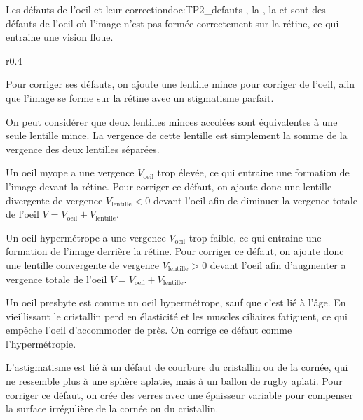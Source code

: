\begin{doc}{Les défauts de l'oeil et leur correction}{doc:TP2_defauts}
  , la , la  et  sont des défauts de l'oeil où l'image n'est pas formée correctement sur la rétine, ce qui entraine une vision floue.

  \begin{wrapfigure}[10]{r}{0.4\linewidth}
    \centering
    \vspace*{-2pt}
    
  \end{wrapfigure}
  
  Pour corriger ses défauts, on ajoute une lentille mince pour corriger  de l'oeil, afin que l'image se forme sur la rétine avec un stigmatisme parfait.

  \begin{importants}
    On peut considérer que deux lentilles minces accolées sont équivalentes à une seule lentille mince.
    La vergence de cette lentille est simplement la somme de la vergence des deux lentilles séparées.
  \end{importants}

  \pointCyan {}

  Un oeil myope a une vergence $V_\text{oeil}$ trop élevée, ce qui entraine une formation de l'image devant la rétine.
  Pour corriger ce défaut, on ajoute donc une lentille divergente de vergence $V_\text{lentille} < 0$ devant l'oeil afin de diminuer la vergence totale de l'oeil $V = V_\text{oeil} + V_\text{lentille}$.

  \pointCyan {}

  Un oeil hypermétrope a une vergence $V_\text{oeil}$ trop faible, ce qui entraine une formation de l'image derrière la rétine.
  Pour corriger ce défaut, on ajoute donc une lentille convergente de vergence $V_\text{lentille} > 0$ devant l'oeil afin d'augmenter a vergence totale de l'oeil $V = V_\text{oeil} + V_\text{lentille}$.

  \pointCyan {}

  Un oeil presbyte est comme un oeil hypermétrope, sauf que c'est lié à l'âge.
  En vieillissant le cristallin perd en élasticité et les muscles ciliaires fatiguent, ce qui empêche l'oeil d'accommoder de près.
  On corrige ce défaut comme l'hypermétropie.

  \pointCyan {}

  L'astigmatisme est lié à un défaut de courbure du cristallin ou de la cornée, qui ne ressemble plus à une sphère aplatie, mais à un ballon de rugby aplati.
  Pour corriger ce défaut, on crée des verres avec une épaisseur variable pour compenser la surface irrégulière de la cornée ou du cristallin.
\end{doc}

